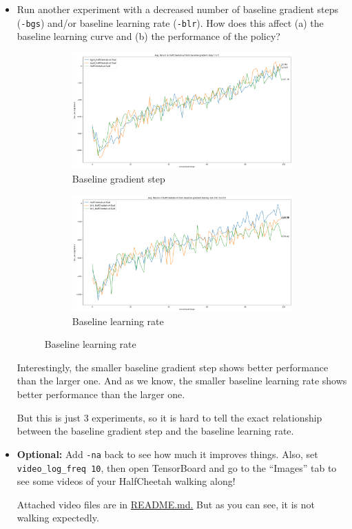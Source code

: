 \documentclass{article}
\begin{document}
\begin{itemize}
    \item Run another experiment with a decreased number of baseline gradient steps (\verb|-bgs|) and/or baseline learning rate (\verb|-blr|). How does this affect (a) the baseline learning curve and (b) the performance of the policy?
    \begin{figure}[H]
        \centering
        \begin{subfigure}{0.48\textwidth}
            \includegraphics[width=0.9\linewidth]{hw2_baseline_bgs.png} 
            \caption{Baseline gradient step}
            \label{fig:3}
        \end{subfigure}
        \begin{subfigure}{0.48\textwidth}
            \includegraphics[width=0.9\linewidth]{hw2_baseline_blr.png}
            \caption{Baseline learning rate}
            \label{fig:4}
        \end{subfigure}
    \end{figure}
    Interestingly, the smaller baseline gradient step shows better performance than the larger one. And as we know, the smaller baseline learning rate shows better performance than the larger one.

    But this is just 3 experiments, so it is hard to tell the exact relationship between the baseline gradient step and the baseline learning rate.
    \item \textbf{Optional:} Add \verb|-na| back to see how much it improves things. Also, set \verb|video_log_freq 10|, then open TensorBoard and go to the ``Images'' tab to see some videos of your HalfCheetah walking along!
    
    Attached video files are in \href{https://github.com/ChanJoon/CS285_hw_fall2023/tree/main/hw2/README.md}{README.md.} But as you can see, it is not walking expectedly.
\end{itemize}
\end{document}
